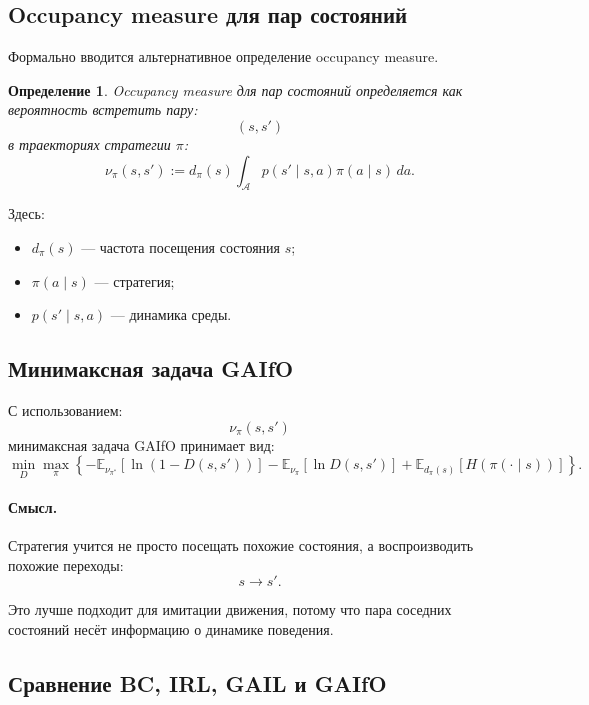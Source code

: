 \documentclass[12pt,a4paper]{article}
\newtheorem{definition}{Определение}
\begin{document}
\subsection{Occupancy measure для пар состояний}

Формально вводится альтернативное определение occupancy measure.

\begin{definition}
Occupancy measure для пар состояний определяется как вероятность встретить пару:
\[
(s,s')
\]
в траекториях стратегии $\pi$:
\[
\nu_\pi(s,s')
:=
d_\pi(s)
\int_{\mathcal A}
p(s'\mid s,a)
\pi(a\mid s)
\,da.
\]
\end{definition}

Здесь:
\begin{itemize}
    \item $d_\pi(s)$ --- частота посещения состояния $s$;
    \item $\pi(a\mid s)$ --- стратегия;
    \item $p(s'\mid s,a)$ --- динамика среды.
\end{itemize}

\subsection{Минимаксная задача GAIfO}

С использованием:
\[
\nu_\pi(s,s')
\]
минимаксная задача GAIfO принимает вид:
\[
\min_D
\max_\pi
\left\{
-
\mathbb E_{\nu_{\pi^\ast}}
\left[
\ln(1-D(s,s'))
\right]
-
\mathbb E_{\nu_\pi}
\left[
\ln D(s,s')
\right]
+
\mathbb E_{d_\pi(s)}
\left[
H(\pi(\cdot\mid s))
\right]
\right\}.
\]

\paragraph{Смысл.}

Стратегия учится не просто посещать похожие состояния, а воспроизводить похожие переходы:
\[
s\to s'.
\]

Это лучше подходит для имитации движения, потому что пара соседних состояний несёт информацию о динамике поведения.

\subsection{Сравнение BC, IRL, GAIL и GAIfO}
\end{document}
